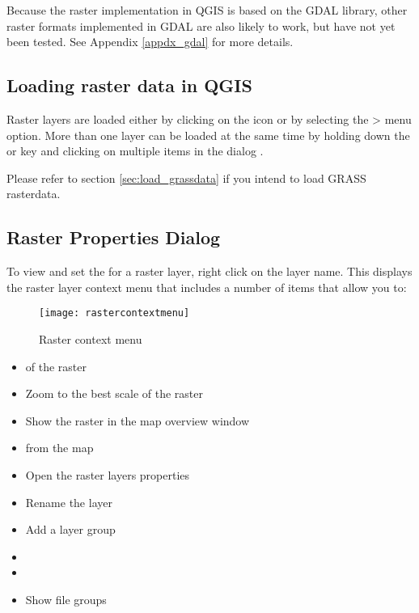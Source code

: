 Because the raster implementation in QGIS is based on the GDAL library, other
raster formats implemented in GDAL are also likely to work, but have not yet
been tested. See Appendix \ref{appdx_gdal} for more
details.
	
\subsection{Loading raster data in QGIS}\label{label_loadraster}

Raster layers are loaded either by clicking on the 
 icon or by
selecting the > menu option. More than one 
layer can be loaded at the same time by holding down the
 or  key
and clicking on multiple items in the dialog .

Please refer to section \ref{sec:load_grassdata} if you intend to load GRASS rasterdata.
	
\subsection{Raster Properties Dialog}\label{label_rasterprop}

To view and set the  for a raster layer, right click on the layer
name. This displays the raster layer context menu that includes a number of
items that allow you to:

\begin{figure}[ht]
   \begin{center}
   \caption{Raster context menu}\label{fig:raster_contextmenu}\smallskip
   \texttt{[image: rastercontextmenu]}
\end{center}  
\end{figure}

\begin{itemize}
\item {} of the raster
\item Zoom to the best scale of the raster
\item Show the raster in the map overview window
\item {} from the map
\item Open the raster layers properties
\item Rename the layer
\item Add a layer group
\item {}
\item {}
\item Show file groups
\end{itemize}

